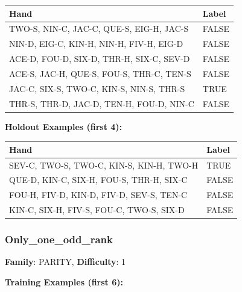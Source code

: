 \documentclass[10pt,a4paper]{article}
\begin{document}
\begin{small}
\begin{tabular}{p{8cm}l}
\toprule
Hand & Label \\
\midrule
TWO-S, NIN-C, JAC-C, QUE-S, EIG-H, JAC-S & \textcolor{negative}{FALSE} \\
NIN-D, EIG-C, KIN-H, NIN-H, FIV-H, EIG-D & \textcolor{negative}{FALSE} \\
ACE-D, FOU-D, SIX-D, THR-H, SIX-C, SEV-D & \textcolor{negative}{FALSE} \\
ACE-S, JAC-H, QUE-S, FOU-S, THR-C, TEN-S & \textcolor{negative}{FALSE} \\
JAC-C, SIX-S, TWO-C, KIN-S, NIN-S, THR-S & \textcolor{positive}{TRUE} \\
THR-S, THR-D, JAC-D, TEN-H, FOU-D, NIN-C & \textcolor{negative}{FALSE} \\
\bottomrule
\end{tabular}
\end{small}

\textbf{Holdout Examples (first 4):}

\begin{small}
\begin{tabular}{p{8cm}l}
\toprule
Hand & Label \\
\midrule
SEV-C, TWO-S, TWO-C, KIN-S, KIN-H, TWO-H & \textcolor{positive}{TRUE} \\
QUE-D, KIN-C, SIX-H, FOU-S, THR-H, SIX-C & \textcolor{negative}{FALSE} \\
FOU-H, FIV-D, KIN-D, FIV-D, SEV-S, TEN-C & \textcolor{negative}{FALSE} \\
KIN-C, SIX-H, FIV-S, FOU-C, TWO-S, SIX-D & \textcolor{negative}{FALSE} \\
\bottomrule
\end{tabular}
\end{small}

\vspace{0.5cm}

\subsubsection{Only\_one\_odd\_rank}

\textbf{Family}: PARITY, \textbf{Difficulty}: 1

\textbf{Training Examples (first 6):}
\end{document}
